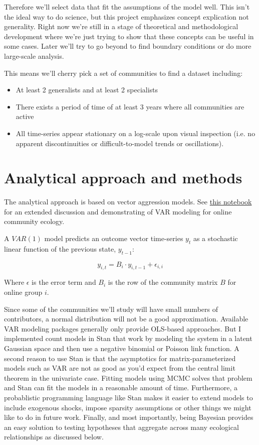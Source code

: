 \documentclass[12pt]{memoir}
\begin{document}
Therefore we'll select data that fit the assumptions of the model well.  This isn't the ideal way to do science, but this project emphasizes concept explication not generality.  Right now we're still in a stage of theoretical and methodological development where we're just trying to show that these concepts can be useful in some cases. Later we'll try to go beyond to find boundary conditions or do more large-scale analysis. 

This means we'll cherry pick a set of communities to find a dataset including:

\begin{itemize}
\item At least 2 generalists and at least 2 specialists
\item There exists a period of time of at least 3 years where all communities are active
\item All time-series appear stationary on a log-scale upon visual inspection (i.e. no apparent discontinuities or difficult-to-model trends or oscillations).
\end{itemize}


\section{Analytical approach and methods}

The analytical approach is based on vector aggression models.  See \href{https://teblunthuis.cc/outgoing/private/notebook_share/notebook-exported.html}{this notebook} for an extended discussion and demonstrating of VAR modeling for online community ecology.

A $VAR(1)$ model predicts an outcome vector time-series $y_t$ as a stochastic linear function of the previous state, $y_{t-1}$:

$$ y_{i,t} = B_i \cdot y_{i,t-1} + \epsilon_{i,i} $$

Where $\epsilon$ is the error term and $B_i$ is the row of the community matrix $B$ for online group $i$.

Since some of the communities we'll study will have small numbers of contributors, a normal distribution will not be a good approximation.  Available VAR modeling packages generally only provide OLS-based approaches. But I implemented count models in Stan that work by modeling the system in a latent Gaussian space and then use a negative binomial or Poisson link function. A second reason to use Stan is that the asymptotics for matrix-parameterized models such as VAR are not as good as you'd expect from the central limit theorem in the univariate case.  Fitting models using MCMC solves that problem and Stan can fit the models in a reasonable amount of time.  Furthermore, a probablistic programming language like Stan makes it easier to extend models to include exogenous shocks, impose sparsity assumptions or other things we might like to do in future work. Finally, and most importantly, being Bayesian provides an easy solution to testing hypotheses that aggregate across many ecological relationships as discussed below.
\end{document}

